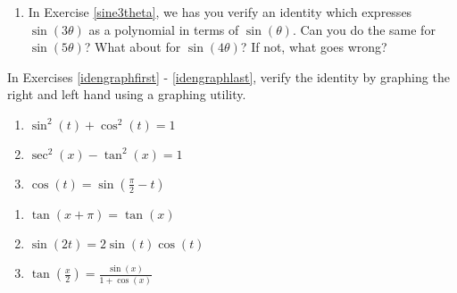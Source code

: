 \documentclass{ximera}
\begin{document}
\begin{enumerate}
\item In Exercise \ref{sine3theta}, we has you verify an identity which expresses $\sin(3\theta)$ as a polynomial in terms of $\sin(\theta)$.   Can you do the same for  $\sin(5\theta)$?  What about for $\sin(4\theta)$?  If not, what goes wrong?

\setcounter{HW}{\value{enumi}}

\end{enumerate}

\pagebreak


In Exercises \ref{idengraphfirst} - \ref{idengraphlast}, verify the identity by graphing the right and left hand using a graphing utility.

\begin{multicols}{3}

\begin{enumerate}

\setcounter{enumi}{\value{HW}}

\item $\sin^{2}(t) + \cos^{2}(t) = 1$  \label{idengraphfirst} 
\item $\sec^{2}(x) - \tan^{2}(x) = 1$ 
\item  $\cos(t) = \sin\left(\frac{\pi}{2} - t\right)$

\setcounter{HW}{\value{enumi}}

\end{enumerate}

\end{multicols}

\begin{multicols}{3}

\begin{enumerate}

\setcounter{enumi}{\value{HW}}

\item  $\tan(x+\pi) = \tan(x)$ 
\item  $\sin(2t) = 2\sin(t)\cos(t)$ 
\item  $\tan\left(\frac{x}{2}\right) = \frac{\sin(x)}{1+\cos(x)}$ \label{idengraphlast}

\setcounter{HW}{\value{enumi}}

\end{enumerate}

\end{multicols}
\end{document}
